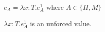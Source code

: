 \begin{case}

$e_{A}=\lambda x:T.e_{A}^{1}$ where $A\in\lbrace H,M\rbrace$

$\lambda x:T.e_{A}^{1}$ is an unforced value.

\end{case}
